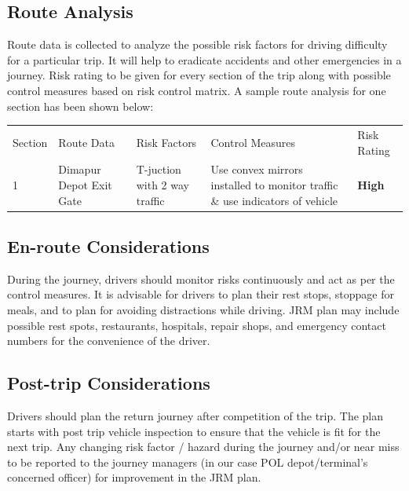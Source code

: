 \documentclass[paper=letter, fontsize=12pt]{article}
\begin{document}
\subsection{Route Analysis}

Route data is collected to analyze the possible risk factors for driving difficulty for a particular trip. It will help to eradicate accidents and other emergencies in a journey. Risk rating to be given for every section of the trip along with possible control measures based on risk control matrix. A sample route analysis for one section has been shown below:\\




\setlength{\arrayrulewidth}{1mm}
\setlength{\tabcolsep}{18pt}
\renewcommand{\arraystretch}{2.5}



\begin{tabular}{ |p{0.5cm}|p{2.5cm}|p{2cm}|p{3cm}|p{1cm}|  }
\hline
\rowcolor{lightgray} \multicolumn{5}{|c|}{Route Analysis} \\
\hline
Section& Route Data &Risk Factors & Control Measures& Risk Rating \\
\hline
1 & Dimapur Depot Exit Gate & T-juction with 2 way traffic& Use convex mirrors installed to monitor traffic \& use indicators of vehicle& \cellcolor[HTML]{FF0000} \textbf{High}\\
\hline
\end{tabular}

\subsection{En-route Considerations}

During the journey, drivers should monitor risks continuously and act as per the control measures. It is advisable for drivers to plan their rest stops, stoppage for meals, and to plan for avoiding distractions while driving. JRM plan may include possible rest spots, restaurants, hospitals, repair shops, and emergency contact numbers for the convenience of the driver.


\subsection{Post-trip Considerations}

Drivers should plan the return journey after competition of the trip. The plan starts with post trip vehicle inspection to ensure that the vehicle is fit for the next trip. Any changing risk factor / hazard during the journey and/or near miss to be reported to the journey managers (in our case POL depot/terminal's concerned officer) for improvement in the JRM plan.
\end{document}
